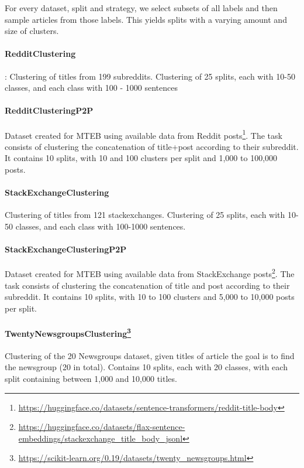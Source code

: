\documentclass[11pt]{article}
\begin{document}
For every dataset, split and strategy, we select subsets of all labels and then sample articles from those labels. This yields splits with a varying amount and size of clusters.

\paragraph{RedditClustering} \cite{geigle2021clustering}: Clustering of titles from 199 subreddits. Clustering of 25 splits, each with 10-50 classes, and each class with 100 - 1000 sentences

\paragraph{RedditClusteringP2P} Dataset created for MTEB using available data from Reddit posts\footnote{\url{https://huggingface.co/datasets/sentence-transformers/reddit-title-body}}. The task consists of clustering the concatenation of title+post according to their subreddit. It contains 10 splits, with 10 and 100 clusters per split and 1,000 to 100,000 posts.

\paragraph{StackExchangeClustering} \cite{geigle2021clustering} Clustering of titles from 121 stackexchanges. Clustering of 25 splits, each with 10-50 classes, and each class with 100-1000 sentences.

\paragraph{StackExchangeClusteringP2P} Dataset created for MTEB using available data from StackExchange posts\footnote{\url{https://huggingface.co/datasets/flax-sentence-embeddings/stackexchange_title_body_jsonl}}. The task consists of clustering the concatenation of title and post according to their subreddit. It contains 10 splits, with 10 to 100 clusters and 5,000 to 10,000 posts per split.

\paragraph{TwentyNewsgroupsClustering\footnote{\url{https://scikit-learn.org/0.19/datasets/twenty_newsgroups.html}}} Clustering of the 20 Newsgroups dataset, given titles of article the goal is to find the newsgroup (20 in total). Contains 10 splits, each with 20 classes, with each split containing between 1,000 and 10,000 titles.
\end{document}
